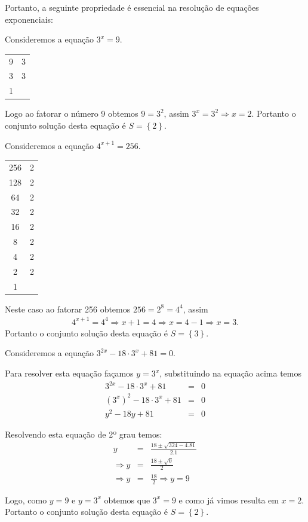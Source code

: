  Portanto, a seguinte propriedade é essencial na resolução de equações exponenciais:


 \begin{exem}
  Consideremos a equação $3^x= 9$.

  \begin{tabular}{c|c}
  9 & 3 \\
  3 & 3 \\
  1 &
  \end{tabular}

  Logo ao fatorar o número 9 obtemos $9= 3^2$, assim $3^x= 3^2 \Rightarrow x= 2$. Portanto o conjunto solução desta equação é $S= \left\{ 2 \right\}$.
 \end{exem}

 \begin{exem}
  Consideremos a equação $4^{x+1}= 256$.

  \begin{tabular}{c|c}
   256 & 2 \\
   128 & 2 \\
   64  & 2 \\
   32  & 2 \\
   16  & 2 \\
   8   & 2 \\
   4   & 2 \\
   2   & 2 \\
   1   &   \\
  \end{tabular}

  Neste caso ao fatorar 256 obtemos $256=2^8 =4^4$, assim
  \begin{eqnarray*}
  4^{x+1}= 4^4 \Rightarrow x+1= 4 \Rightarrow x= 4-1 \Rightarrow x=3.
  \end{eqnarray*}
  Portanto o conjunto solução desta equação é $S= \left\{ 3 \right\}$.
 \end{exem}

 \begin{exem}
  Consideremos a equação $3^{2x}- 18\cdot 3^x + 81=0$.

  Para resolver esta equação façamos $y= 3^x$, substituindo na equação acima temos
  \begin{eqnarray*}
   3^{2x} - 18\cdot 3^x + 81&=& 0 \\
   (3^x)^2 - 18\cdot 3^x + 81&=& 0 \\
   y^2 - 18y + 81 &=& 0
  \end{eqnarray*}

  Resolvendo esta equação de 2º grau temos:
  \begin{eqnarray*}
   y &=& \frac{18 \pm \sqrt{324 - 4.81}}{2.1} \\
   \Rightarrow y&=& \frac{18 \pm \sqrt{0}}{2} \\
   \Rightarrow y&=& \frac{18}{2} \Rightarrow y= 9
  \end{eqnarray*}

  Logo, como $y= 9$ e $y= 3^x$ obtemos que $3^x= 9$ e como já vimos resulta em $x= 2$. Portanto o conjunto solução desta equação é $S= \left\{ 2 \right\}$.
 \end{exem}

